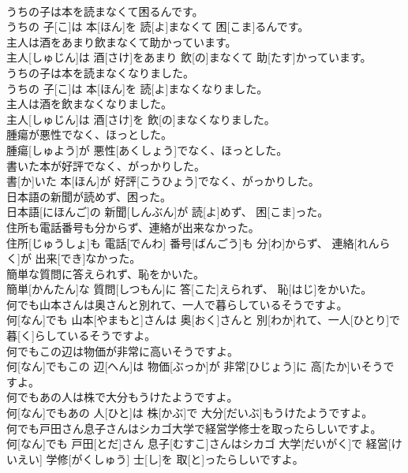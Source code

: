 \documentclass[8pt]{extreport}
\begin{document}
\begin{CJK}{UTF8}{min}
\\	うちの子は本を読まなくて困るんです。	
\\	うちの 子[こ]は 本[ほん]を 読[よ]まなくて 困[こま]るんです。
\\	主人は酒をあまり飲まなくて助かっています。	
\\	主人[しゅじん]は 酒[さけ]をあまり 飲[の]まなくて 助[たす]かっています。
\\	うちの子は本を読まなくなりました。	
\\	うちの 子[こ]は 本[ほん]を 読[よ]まなくなりました。
\\	主人は酒を飲まなくなりました。	
\\	主人[しゅじん]は 酒[さけ]を 飲[の]まなくなりました。
\\	腫瘍が悪性でなく、ほっとした。	
\\	腫瘍[しゅよう]が 悪性[あくしょう]でなく、ほっとした。
\\	書いた本が好評でなく、がっかりした。	
\\	書[か]いた 本[ほん]が 好評[こうひょう]でなく、がっかりした。
\\	日本語の新聞が読めず、困った。	
\\	日本語[にほんご]の 新聞[しんぶん]が 読[よ]めず、 困[こま]った。
\\	住所も電話番号も分からず、連絡が出来なかった。	
\\	住所[じゅうしょ]も 電話[でんわ] 番号[ばんごう]も 分[わ]からず、 連絡[れんらく]が 出来[でき]なかった。
\\	簡単な質問に答えられず、恥をかいた。	
\\	簡単[かんたん]な 質問[しつもん]に 答[こた]えられず、 恥[はじ]をかいた。
\\	何でも山本さんは奥さんと別れて、一人で暮らしているそうですよ。	
\\	何[なん]でも 山本[やまもと]さんは 奥[おく]さんと 別[わか]れて、一人[ひとり]で 暮[く]らしているそうですよ。
\\	何でもこの辺は物価が非常に高いそうですよ。	
\\	何[なん]でもこの 辺[へん]は 物価[ぶっか]が 非常[ひじょう]に 高[たか]いそうですよ。
\\	何でもあの人は株で大分もうけたようですよ。	
\\	何[なん]でもあの 人[ひと]は 株[かぶ]で 大分[だいぶ]もうけたようですよ。
\\	何でも戸田さん息子さんはシカゴ大学で経営学修士を取ったらしいですよ。	
\\	何[なん]でも 戸田[とだ]さん 息子[むすこ]さんはシカゴ 大学[だいがく]で 経営[けいえい] 学修[がくしゅう] 士[し]を 取[と]ったらしいですよ。

\end{CJK}
\end{document}
